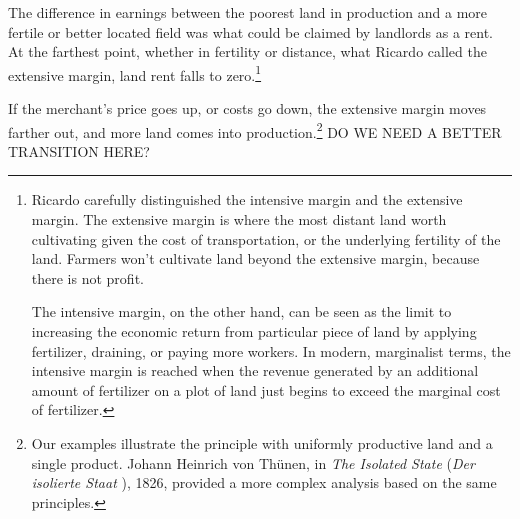 The difference in earnings between the poorest land in production and a more fertile or better located field was what could be claimed by landlords as a rent. 
At the farthest point, whether in fertility or distance, what Ricardo called the \gls{extensive margin}, land \gls{rent} falls to zero.\footnote{Ricardo carefully distinguished the \gls{intensive margin} and the \gls{extensive margin}. The extensive margin is where the most distant land worth cultivating given the cost of transportation, or the underlying fertility of the land. Farmers won't cultivate land beyond the extensive margin, because there is not profit. 

The intensive margin, on the other hand, can be seen as the limit to increasing the economic return from  particular piece of land by applying fertilizer, draining, or paying more workers. In modern, \gls{marginalist} terms, the intensive margin is reached when the revenue generated by an additional amount of fertilizer on a plot of land just begins to exceed the marginal cost of fertilizer.} 

If the merchant's price goes up, or costs go down, the \gls{extensive margin} moves farther out, and more land comes into production.\footnote{Our examples illustrate the principle with uniformly productive land and a single product. Johann Heinrich von Th\"unen, in \textit{The Isolated State} (\textit{Der isolierte Staat} \cite{vonthunenIsolirteStaatBeziehung1826}), 1826, provided a more complex analysis based on the same principles.}
DO WE NEED A BETTER TRANSITION HERE?

